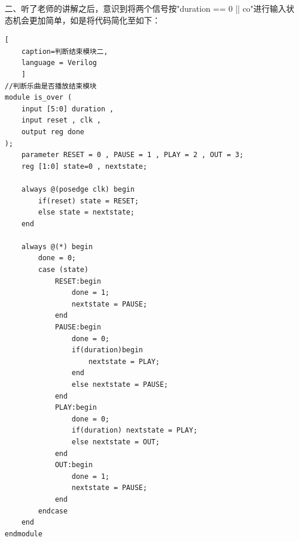 \documentclass{ctexart}
\begin{document}
            二、听了老师的讲解之后，意识到将两个信号按"duration == 0 || co"进行输入状态机会更加简单，如是将代码简化至如下：
\begin{lstlisting}[
    caption=判断结束模块二,
    language = Verilog
    ]
//判断乐曲是否播放结束模块
module is_over (
    input [5:0] duration ,
    input reset , clk ,
    output reg done
);
    parameter RESET = 0 , PAUSE = 1 , PLAY = 2 , OUT = 3;
    reg [1:0] state=0 , nextstate;

    always @(posedge clk) begin
        if(reset) state = RESET;
        else state = nextstate;
    end

    always @(*) begin
        done = 0;
        case (state)
            RESET:begin
                done = 1;
                nextstate = PAUSE;
            end 
            PAUSE:begin
                done = 0;
                if(duration)begin
                    nextstate = PLAY;
                end
                else nextstate = PAUSE;
            end
            PLAY:begin
                done = 0;
                if(duration) nextstate = PLAY;
                else nextstate = OUT;
            end
            OUT:begin
                done = 1;
                nextstate = PAUSE;
            end
        endcase
    end
endmodule
\end{lstlisting}
\end{document}

